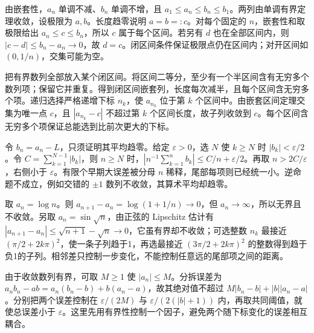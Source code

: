 \documentclass[12pt,fontset=fandol]{ctexart}
\begin{document}
\begin{solve}\label{ans:c2q11}
由嵌套性，$a_n$ 单调不减、$b_n$ 单调不增，且 $a_1\le a_n\le b_n\le b_1$。两列由单调有界定理收敛，设极限为 $a,b$。长度趋零说明 $a=b=:c$。对每个固定的 $n$，嵌套性和取极限给出 $a_n\le c\le b_n$，所以 $c$ 属于每个区间。若另有 $d$ 也在全部区间内，则 $|c-d|\le b_n-a_n\to0$，故 $d=c$。闭区间条件保证极限点仍在区间内；对开区间如 $(0,1/n)$，交集可能为空。
\end{solve}

\begin{solve}\label{ans:c2q12}
把有界数列全部放入某个闭区间。将区间二等分，至少有一个半区间含有无穷多个数列项；保留它并重复。得到闭区间嵌套列，长度每次减半，且每个区间含无穷多个项。递归选择严格递增下标 $n_k$，使 $a_{n_k}$ 位于第 $k$ 个区间中。由嵌套区间定理交集为唯一点 $c$，且 $|a_{n_k}-c|$ 不超过第 $k$ 个区间长度，故子列收敛到 $c$。每个区间含无穷多个项保证总能选到比前次更大的下标。
\end{solve}

\begin{solve}\label{ans:c2q13}
令 $b_n=a_n-L$，只须证明其平均趋零。给定 $\varepsilon>0$，选 $N$ 使 $k\ge N$ 时 $|b_k|<\varepsilon/2$。令 $C=\sum_{k=1}^{N-1}|b_k|$，则 $n\ge N$ 时，$|n^{-1}\sum_{k=1}^nb_k|\le C/n+\varepsilon/2$。再取 $n>2C/\varepsilon$，右侧小于 $\varepsilon$。有限个早期大误差被分母 $n$ 稀释，尾部每项则已经统一小。逆命题不成立，例如交错的 $\pm1$ 数列不收敛，其算术平均却趋零。
\end{solve}

\begin{solve}\label{ans:c2q14}
取 $a_n=\log n$。则 $a_{n+1}-a_n=\log(1+1/n)\to0$，但 $a_n\to\infty$，所以无界且不收敛。另取 $a_n=\sin\sqrt n$，由正弦的 Lipschitz 估计有 $|a_{n+1}-a_n|\le\sqrt{n+1}-\sqrt n\to0$，它虽有界却不收敛；可选整数 $n_k$ 最接近 $(\pi/2+2k\pi)^2$，使一条子列趋于1，再选最接近 $(3\pi/2+2k\pi)^2$ 的整数得到趋于负1的子列。相邻差只控制一步变化，不能控制任意远的尾部项之间的距离。
\end{solve}

\begin{solve}\label{ans:c2q15}
由于收敛数列有界，可取 $M\ge1$ 使 $|a_n|\le M$。分拆误差为 $a_nb_n-ab=a_n(b_n-b)+b(a_n-a)$，故其绝对值不超过 $M|b_n-b|+|b||a_n-a|$。分别把两个误差控制在 $\varepsilon/(2M)$ 与 $\varepsilon/(2(|b|+1))$ 内，再取共同阈值，就使总误差小于 $\varepsilon$。这里先用有界性控制一个因子，避免两个随下标变化的误差相互耦合。
\end{solve}
\end{document}
